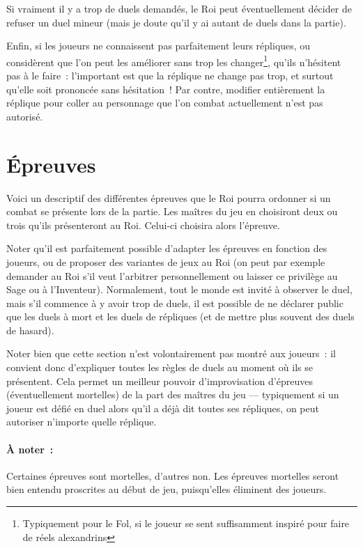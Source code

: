 {{	Si vraiment il y a trop de duels demandés, le Roi peut éventuellement décider de refuser un duel mineur (mais je doute qu’il y ai autant de duels dans la partie).

	Enfin, si les joueurs ne connaissent pas parfaitement leurs répliques, ou considèrent que l’on peut les améliorer sans trop les changer\footnote{Typiquement pour le Fol, si le joueur se sent suffisamment inspiré pour faire de réels alexandrins}, qu’ils n’hésitent pas à le faire~:  l’important est que la réplique ne change pas trop, et surtout qu’elle soit prononcée sans hésitation~!
	Par contre, modifier entièrement la réplique pour coller au personnage que l’on combat actuellement n’est pas autorisé.
}

\section{Épreuves}
\label{sec:epreuves}

Voici un descriptif des différentes épreuves que le Roi pourra ordonner si un combat se présente lors de la partie.
Les maîtres du jeu en choisiront deux ou trois qu’ils présenteront au Roi.
Celui-ci choisira alors l’épreuve.

Noter qu’il est parfaitement possible d’adapter les épreuves en fonction des joueurs, ou de proposer des variantes de jeux au Roi (on peut par exemple demander au Roi s’il veut l’arbitrer personnellement ou laisser ce privilège au Sage ou à l’Inventeur).
Normalement, tout le monde est invité à observer le duel, mais s’il commence à y avoir trop de duels, il est possible de ne déclarer public que les duels à mort et les duels de répliques (et de mettre plus souvent des duels de hasard).

Noter bien que cette section n’est volontairement pas montré aux joueurs~:  il convient donc d’expliquer toutes les règles de duels au moment où ils se présentent.
Cela permet un meilleur pouvoir d’improvisation d’épreuves (éventuellement mortelles) de la part des maîtres du jeu — typiquement si un joueur est défié en duel alors qu’il a déjà dit toutes ses répliques, on peut autoriser n’importe quelle réplique.

\paragraph{À noter~:}
{
Certaines épreuves sont mortelles, d’autres non.
Les épreuves mortelles seront bien entendu proscrites au début de jeu, puisqu’elles éliminent des joueurs.
}

}
